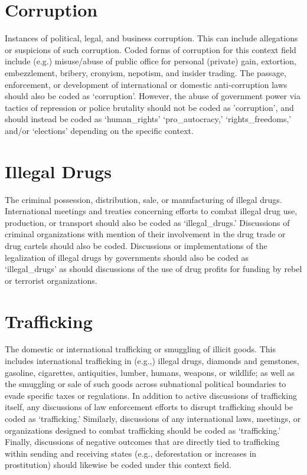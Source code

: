\documentclass[11pt]{report}
\begin{document}
\section{Corruption}\label{context:corruption}
Instances of political, legal, and business corruption. This can include allegations or suspicions of such corruption. Coded forms of corruption for this context field include (e.g.) misuse/abuse of public office for personal (private) gain, extortion, embezzlement, bribery, cronyism, nepotism, and insider trading. The passage, enforcement, or development of international or domestic anti-corruption laws should also be coded as `corruption'. However, the abuse of government power via tactics of repression or police brutality should not be coded as 'corruption', and should instead be coded as `human\_rights' `pro\_autocracy,'   `rights\_freedoms,' and/or `elections' depending on the specific context.

\section{Illegal Drugs}\label{context:drugs}
The criminal possession, distribution, sale, or manufacturing of illegal drugs. International meetings and treaties concerning efforts to combat illegal drug use, production, or transport should also be coded as `illegal\_drugs.' Discussions of criminal organizations with mention of their involvement in the drug trade or drug cartels should also be coded. Discussions or implementations of the legalization of illegal drugs by governments should also be coded as `illegal\_drugs' as should discussions of the use of drug profits for funding by rebel or terrorist organizations.

\section{Trafficking}\label{context:trafficking}
The domestic or international trafficking or smuggling of illicit goods. This includes international trafficking in (e.g.,) illegal drugs, diamonds and gemstones, gasoline, cigarettes, antiquities, lumber, humans, weapons, or wildlife; as well as the smuggling or sale of such goods across subnational political boundaries to evade specific taxes or regulations. In addition to active discussions of trafficking itself, any discussions of law enforcement efforts to disrupt trafficking should be coded as `trafficking.' Similarly, discussions of any international laws, meetings, or organizations designed to combat trafficking should be coded as  `trafficking.' Finally, discussions of negative outcomes that are directly tied to trafficking within sending and receiving states (e.g., deforestation or increases in prostitution) should likewise be coded under this context field.
\end{document}
